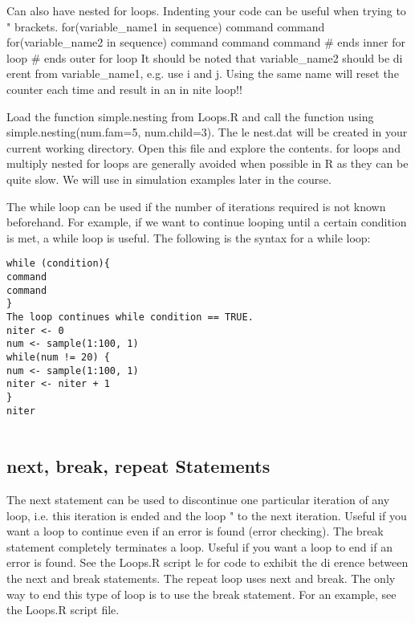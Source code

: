 Can also have nested for loops. Indenting your code can be useful
when trying to \match" brackets.
for(variable_name1 in sequence) {
command
command
for(variable_name2 in sequence) {
command
command
command
} # ends inner for loop
} # ends outer for loop
It should be noted that variable_name2 should be di erent from
variable_name1, e.g. use i and j. Using the same name will
reset the counter each time and result in an in nite loop!!


Load the function simple.nesting from Loops.R and call the
function using
simple.nesting(num.fam=5, num.child=3).
The le nest.dat will be created in your current working
directory. Open this file and explore the contents.
for loops and multiply nested for loops are generally avoided
when possible in R as they can be quite slow. We will use in
simulation examples later in the course.


The while loop can be used if the number of iterations required is
not known beforehand. For example, if we want to continue
looping until a certain condition is met, a while loop is useful.
The following is the syntax for a while loop:
\begin{verbatim}
while (condition){
command
command
}
The loop continues while condition == TRUE.
niter <- 0
num <- sample(1:100, 1)
while(num != 20) {
num <- sample(1:100, 1)
niter <- niter + 1
}
niter
    
\end{verbatim}

\subsection*{next, break, repeat Statements}
The next statement can be used to discontinue one particular
iteration of any loop, i.e. this iteration is ended and the loop
\skips" to the next iteration. Useful if you want a loop to continue
even if an error is found (error checking).
The break statement completely terminates a loop. Useful if you
want a loop to end if an error is found. See the Loops.R script le
for code to exhibit the di erence between the next and break
statements.
The repeat loop uses next and break. The only way to end this
type of loop is to use the break statement. For an example, see
the Loops.R script file.

